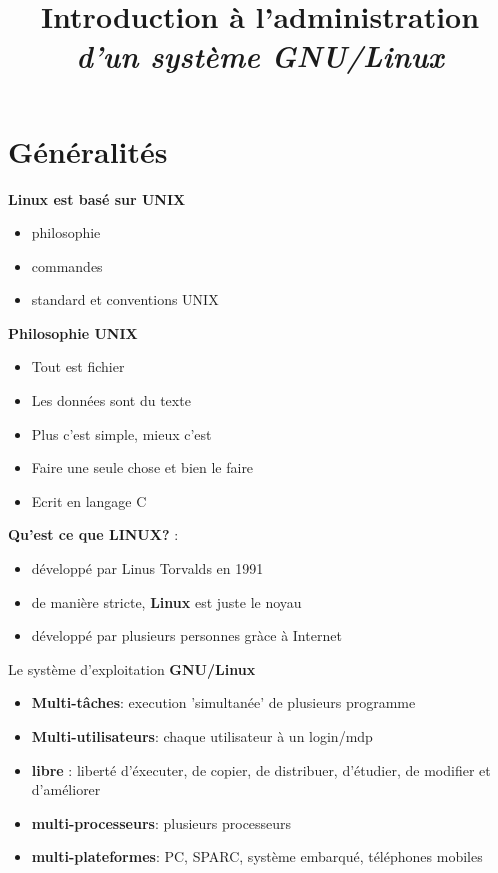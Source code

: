 \documentclass[french]{beamer}
\title{Introduction à l'administration \\ \textit{d'un système GNU/Linux}}
\author{}
\institute{Agence universitaire de la Francophonie}
\begin{document}
\begin{frame}
\titlepage
\end{frame}

\section{Généralités}
\frame{\tableofcontents[current]}

\begin{frame}
\textbf{Linux est basé sur UNIX}
    \begin{itemize}
    \item philosophie
    \item commandes
    \item standard et conventions UNIX
    \end{itemize}
\end{frame}

\begin{frame}
\textbf{Philosophie UNIX}
    \begin{itemize}
    \item Tout est fichier
    \item Les données sont du texte
    \item Plus c'est simple, mieux c'est
    \item Faire une seule chose et bien le faire
    \item Ecrit en langage C
    \end{itemize}
\end{frame}

\begin{frame}
\textbf{Qu'est ce que LINUX?} :
    \begin{itemize}
    \item développé par Linus Torvalds en 1991
    \item de manière stricte, \textbf{Linux} est juste le noyau
    \item développé par plusieurs personnes gràce à Internet
    \end{itemize}
\end{frame}

\begin{frame}
Le système d'exploitation \textbf{GNU/Linux}
    \begin{itemize}
    \item \textbf{Multi-tâches}: execution 'simultanée' de plusieurs programme
    \item \textbf{Multi-utilisateurs}: chaque utilisateur à un login/mdp
    \item \textbf{libre} : liberté d'éxecuter, de copier, de distribuer, d'étudier, de
    modifier et d'améliorer
    \item \textbf{multi-processeurs}: plusieurs processeurs
    \item \textbf{multi-plateformes}: PC, SPARC, système embarqué, téléphones
    mobiles
    \end{itemize}
\end{frame}
\end{document}
